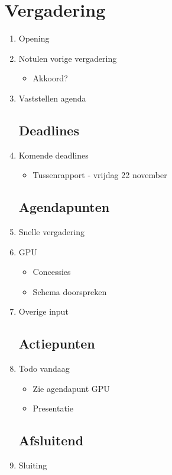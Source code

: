 \documentclass{article}
\begin{document}
\section*{Vergadering}
\begin{enumerate}
	
	\subsection*{Vooraf}
	\item Opening
	\item Notulen vorige vergadering
	\begin{itemize}
		\item Akkoord?
	\end{itemize}
	\item Vaststellen agenda

	\subsection*{Deadlines}
	\item Komende deadlines
	\begin{itemize}
		\item Tussenrapport - vrijdag 22 november
	\end{itemize}

	\subsection*{Agendapunten}

	\item Snelle vergadering

	\item GPU
	\begin{itemize}
		\item Concessies
		\item Schema doorspreken
	\end{itemize}

	\item Overige input
	\subsection*{Actiepunten}
	\item Todo vandaag
	\begin{itemize}
		\item Zie agendapunt GPU
		\item Presentatie
	\end{itemize}

	\noindent 
	\subsection*{Afsluitend}
	\item Sluiting

\end{enumerate}
\end{document}
